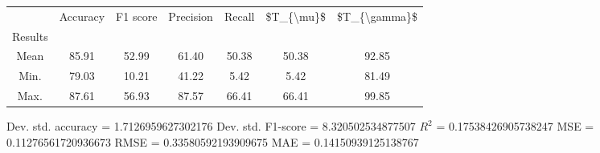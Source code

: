 \begin{tabular}{|c|c|c|c|c|c|c|}
\toprule
{} &  Accuracy &  F1 score &  Precision &  Recall &  \$T\_\{\textbackslash mu\}\$ &  \$T\_\{\textbackslash gamma\}\$ \\
Results &           &           &            &         &            &               \\
\hline
Mean    &     85.91 &     52.99 &      61.40 &   50.38 &      50.38 &         92.85 \\
Min.    &     79.03 &     10.21 &      41.22 &    5.42 &       5.42 &         81.49 \\
Max.    &     87.61 &     56.93 &      87.57 &   66.41 &      66.41 &         99.85 \\
\bottomrule
\end{tabular}

 Dev. std. accuracy = 1.7126959627302176
 Dev. std. F1-score = 8.320502534877507
 $R^2$ = 0.17538426905738247
 MSE = 0.11276561720936673
 RMSE = 0.33580592193909675
 MAE = 0.14150939125138767